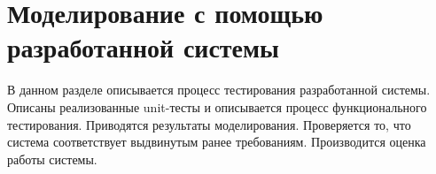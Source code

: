 \section{Моделирование с помощью разработанной системы}
\begin{annotation}
	В данном разделе описывается процесс тестирования разработанной системы.
	Описаны реализованные unit-тесты и описывается процесс функционального тестирования.
	Приводятся результаты моделирования. Проверяется то, что система соответствует выдвинутым ранее требованиям.
	Производится оценка работы системы.
\end{annotation}








